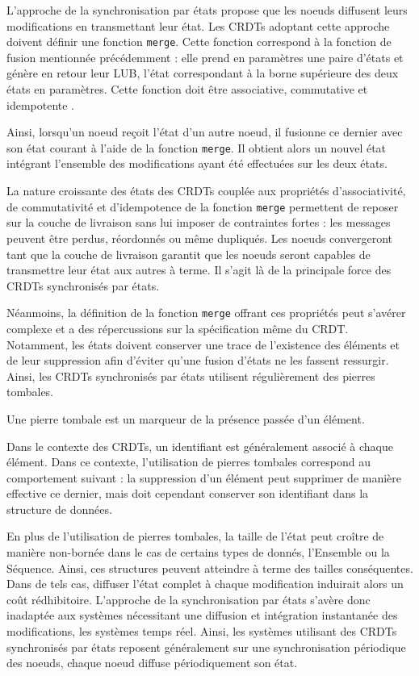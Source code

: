 L'approche de la synchronisation par états propose que les noeuds diffusent leurs modifications en transmettant leur état.
Les \acp{CRDT} adoptant cette approche doivent définir une fonction \texttt{merge}.
Cette fonction correspond à la fonction de fusion mentionnée précédemment  : elle prend en paramètres une paire d'états et génère en retour leur \ac{LUB}, \ie l'état correspondant à la borne supérieure des deux états en paramètres.
Cette fonction doit être associative, commutative et idempotente \cite{shapiro_2011_crdt}.

Ainsi, lorsqu'un noeud reçoit l'état d'un autre noeud, il fusionne ce dernier avec son état courant à l'aide de la fonction \texttt{merge}.
Il obtient alors un nouvel état intégrant l'ensemble des modifications ayant été effectuées sur les deux états.

La nature croissante des états des \acp{CRDT} couplée aux propriétés d'associativité, de commutativité et d'idempotence de la fonction \texttt{merge} permettent de reposer sur la couche de livraison sans lui imposer de contraintes fortes : les messages peuvent être perdus, réordonnés ou même dupliqués.
Les noeuds convergeront tant que la couche de livraison garantit que les noeuds seront capables de transmettre leur état aux autres à terme.
Il s'agit là de la principale force des \acp{CRDT} synchronisés par états.

Néanmoins, la définition de la fonction \texttt{merge} offrant ces propriétés peut s'avérer complexe et a des répercussions sur la spécification même du \ac{CRDT}.
Notamment, les états doivent conserver une trace de l'existence des éléments et de leur suppression afin d'éviter qu'une fusion d'états ne les fassent ressurgir.
Ainsi, les \acp{CRDT} synchronisés par états utilisent régulièrement des pierres tombales.

\begin{definition}
  Une pierre tombale est un marqueur de la présence passée d'un élément.

  Dans le contexte des \acp{CRDT}, un identifiant est généralement associé à chaque élément.
  Dans ce contexte, l'utilisation de pierres tombales correspond au comportement suivant : la suppression d'un élément peut supprimer de manière effective ce dernier, mais doit cependant conserver son identifiant dans la structure de données.
\end{definition}

En plus de l'utilisation de pierres tombales, la taille de l'état peut croître de manière non-bornée dans le cas de certains types de donnés, \eg l'Ensemble ou la Séquence.
Ainsi, ces structures peuvent atteindre à terme des tailles conséquentes.
Dans de tels cas, diffuser l'état complet à chaque modification induirait alors un coût rédhibitoire.
L'approche de la synchronisation par états s'avère donc inadaptée aux systèmes nécessitant une diffusion et intégration instantanée des modifications, \ie les systèmes temps réel.
Ainsi, les systèmes utilisant des \acp{CRDT} synchronisés par états reposent généralement sur une synchronisation périodique des noeuds, \ie chaque noeud diffuse périodiquement son état.

